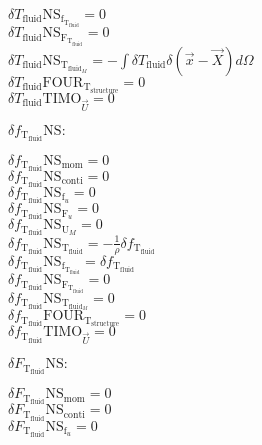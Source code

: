 \documentclass[10pt]{article} %
\begin{document}
\begin{center}
	$\delta T_{\text{fluid}} \text{NS}_{\text{f}_{\text{T}_{\text{fluid}}}} = 0$\\
	$\delta T_{\text{fluid}} \text{NS}_{\text{F}_{\text{T}_{\text{fluid}}}} = 0$\\
	$\delta T_{\text{fluid}} \text{NS}_{\text{T}_{\text{fluid}_M}} = -\int \delta T_{\text{fluid}} \delta (\vec{x}-\vec{X}) d\Omega$\\
	$\delta T_{\text{fluid}} \text{FOUR}_{\text{T}_{\text{structure}}} = 0$\\
	$\delta T_{\text{fluid}} \text{TIMO}_{\vec{U}} = 0$\\
\begin{flushleft}
	$\delta f_{\text{T}_{\text{fluid}}} \text{NS}:$
\end{flushleft}
	$\delta f_{\text{T}_{\text{fluid}}} \text{NS}_{\text{mom}} =  0$\\
	$\delta f_{\text{T}_{\text{fluid}}} \text{NS}_{\text{conti}} = 0$\\
	$\delta f_{\text{T}_{\text{fluid}}} \text{NS}_{\text{f}_u} = 0$\\
	$\delta f_{\text{T}_{\text{fluid}}} \text{NS}_{\text{F}_u} = 0$\\
	$\delta f_{\text{T}_{\text{fluid}}} \text{NS}_{\text{U}_M} = 0$\\
	$\delta f_{\text{T}_{\text{fluid}}} \text{NS}_{\text{T}_{\text{fluid}}} = -\frac{1}{\rho}\delta f_{\text{T}_{\text{fluid}}}$\\
	$\delta f_{\text{T}_{\text{fluid}}} \text{NS}_{\text{f}_{\text{T}_{\text{fluid}}}} = \delta f_{\text{T}_{\text{fluid}}}$\\
	$\delta f_{\text{T}_{\text{fluid}}} \text{NS}_{\text{F}_{\text{T}_{\text{fluid}}}} = 0$\\
	$\delta f_{\text{T}_{\text{fluid}}} \text{NS}_{\text{T}_{\text{fluid}_M}} = 0$\\
	$\delta f_{\text{T}_{\text{fluid}}} \text{FOUR}_{\text{T}_{\text{structure}}} = 0$\\
	$\delta f_{\text{T}_{\text{fluid}}} \text{TIMO}_{\vec{U}} = 0$\\
\begin{flushleft}
	$\delta F_{\text{T}_{\text{fluid}}} \text{NS}:$
\end{flushleft}
	$\delta F_{\text{T}_{\text{fluid}}} \text{NS}_{\text{mom}} = 0$\\
	$\delta F_{\text{T}_{\text{fluid}}} \text{NS}_{\text{conti}} = 0$\\
	$\delta F_{\text{T}_{\text{fluid}}} \text{NS}_{\text{f}_u} = 0$\\

\end{center}
\end{document}
